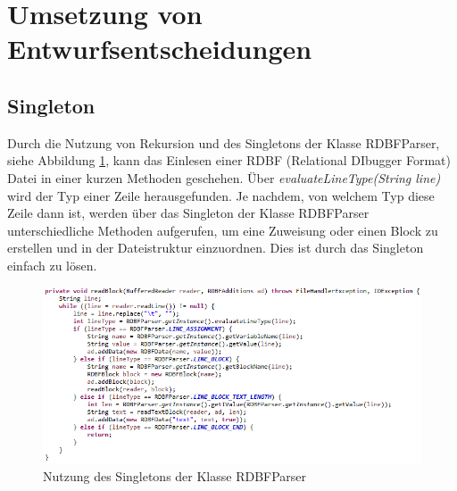 \documentclass[parskip=full]{scrartcl}
\begin{document}
\section{Umsetzung von Entwurfsentscheidungen}
\subsection{Singleton}
Durch die Nutzung von Rekursion und des Singletons der Klasse RDBFParser, siehe Abbildung \ref{loadRDBF}, kann das Einlesen einer RDBF (Relational DIbugger Format) Datei in einer kurzen Methoden geschehen.
Über \textit{evaluateLineType(String line)} wird der Typ einer Zeile herausgefunden. Je nachdem, von welchem Typ diese Zeile dann ist, werden über das Singleton der Klasse RDBFParser unterschiedliche Methoden aufgerufen, um eine Zuweisung oder einen Block zu erstellen und in der Dateistruktur einzuordnen. Dies ist durch das Singleton einfach zu lösen.
\begin{figure}[!h]
\includegraphics[width=1.0\textwidth]{document_data/loadRDBFFile.png}
\caption{Nutzung des Singletons der Klasse RDBFParser}
\label{loadRDBF}
\end{figure}


\newpage
\end{document}
